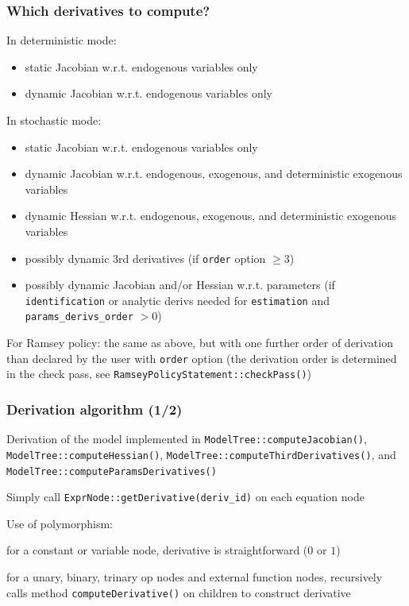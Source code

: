 \documentclass[aspectratio=169]{beamer}
\newenvironment{witemize}{\itemize\addtolength{\itemsep}{8pt}}{\enditemize}
\begin{document}
\begin{frame}
  \frametitle{Which derivatives to compute?}
  \begin{witemize}
  \item In deterministic mode:
    \begin{itemize}
    \item static Jacobian w.r.t. endogenous variables only
    \item dynamic Jacobian w.r.t. endogenous variables only
    \end{itemize}
  \item In stochastic mode:
    \begin{itemize}
    \item static Jacobian w.r.t. endogenous variables only
    \item dynamic Jacobian w.r.t. endogenous, exogenous, and deterministic exogenous variables
    \item dynamic Hessian w.r.t. endogenous, exogenous, and deterministic exogenous variables
    \item possibly dynamic 3rd derivatives (if \texttt{order} option $\geq 3$)
    \item possibly dynamic Jacobian and/or Hessian w.r.t. parameters (if \texttt{identification} or analytic derivs needed for \texttt{estimation} and \texttt{params\_derivs\_order} $>0$)
    \end{itemize}
  \item For Ramsey policy: the same as above, but with one further order of derivation than declared by the user with \texttt{order} option (the derivation order is determined in the check pass, see \texttt{RamseyPolicyStatement::checkPass()})
  \end{witemize}
\end{frame}

\begin{frame}
  \frametitle{Derivation algorithm (1/2)}
  \begin{witemize}
  \item Derivation of the model implemented in \texttt{ModelTree::computeJacobian()}, \texttt{ModelTree::computeHessian()}, \texttt{ModelTree::computeThirdDerivatives()}, and \texttt{ModelTree::computeParamsDerivatives()}
  \item Simply call \texttt{ExprNode::getDerivative(deriv\_id)} on each equation node
  \item Use of polymorphism:
    \begin{witemize}
    \item for a constant or variable node, derivative is straightforward ($0$ or $1$)
    \item for a unary, binary, trinary op nodes and external function nodes, recursively calls method \texttt{computeDerivative()} on children to construct derivative
    \end{witemize}
  \end{witemize}
\end{frame}
\end{document}
